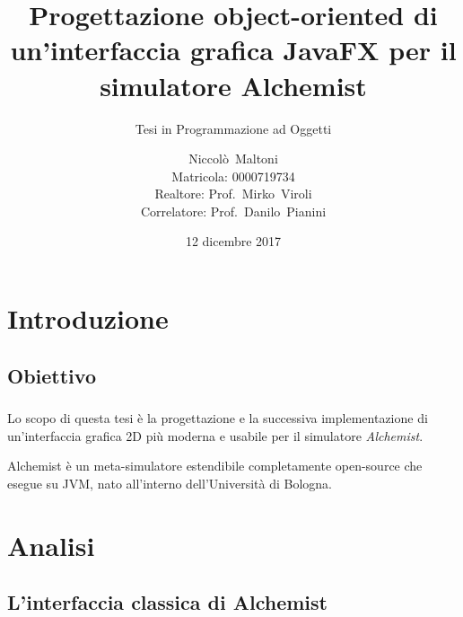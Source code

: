\documentclass[%
]{beamer}
\title[Nuova GUI Alchemist in JavaFX]{%
    Progettazione object-oriented di un'interfaccia grafica %
    JavaFX per il simulatore Alchemist
}
\subtitle{Tesi in Programmazione ad Oggetti}
\author[Niccolò~Maltoni (0000719734)]{%
    Niccolò~Maltoni%
    \\ \small{Matricola: 0000719734}%
    \\ \vspace{10pt} \small{Realtore: Prof.~Mirko~Viroli \\Correlatore: Prof.~Danilo~Pianini}%
}
\date{12 dicembre 2017}
\institute[]{%
    Alma Mater Studiorum - Università di Bologna\\%
    Campus di Cesena%
}
\begin{document}
    \begin{frame}
        \titlepage
    \end{frame}

    \section{Introduzione}\label{sec:intro}
        \subsection{Obiettivo}\label{subsec:obiettivo}
            \begin{frame}
                \frametitle{\insertsection}
                \framesubtitle{\insertsubsection}
                Lo scopo di questa tesi è la progettazione e la successiva implementazione di un'interfaccia grafica 2D più moderna e usabile per il simulatore \emph{Alchemist}.

                \medskip

                Alchemist è un meta-simulatore estendibile completamente open-source che esegue su JVM, nato all’interno dell’Università di Bologna.
            \end{frame}

    \section{Analisi}\label{sec:analisi}
        \subsection{L'interfaccia classica di Alchemist}\label{subsec:oldgui}
            \begin{frame}
                \frametitle{\insertsection}
                \framesubtitle{\insertsubsection}
                \centering
            \end{frame}
\end{document}

